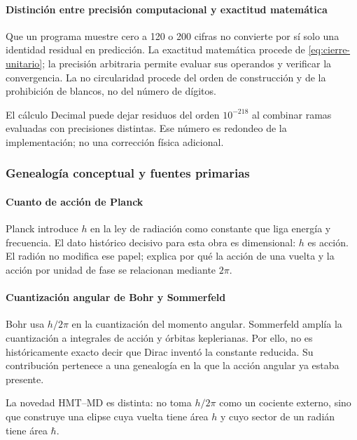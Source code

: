 \paragraph{Distinción entre precisión computacional y exactitud matemática}

Que un programa muestre cero a 120 o 200 cifras no convierte por sí solo una
identidad residual en predicción. La exactitud matemática procede de
\eqref{eq:cierre-unitario}; la precisión arbitraria permite evaluar sus
operandos y verificar la convergencia. La no circularidad procede del orden
de construcción y de la prohibición de blancos, no del número de dígitos.

El cálculo Decimal puede dejar residuos del orden \(10^{-218}\) al combinar
ramas evaluadas con precisiones distintas. Ese número es redondeo de la
implementación; no una corrección física adicional.
\subsubsection{Genealogía conceptual y fuentes primarias}

\paragraph{Cuanto de acción de Planck}

Planck introduce \(h\) en la ley de radiación como constante que liga energía
y frecuencia. El dato histórico decisivo para esta obra es dimensional:
\(h\) es acción. El radión no modifica ese papel; explica por qué la acción de
una vuelta y la acción por unidad de fase se relacionan mediante \(2\pi\).

\paragraph{Cuantización angular de Bohr y Sommerfeld}

Bohr usa \(h/2\pi\) en la cuantización del momento angular. Sommerfeld amplía
la cuantización a integrales de acción y órbitas keplerianas. Por ello, no es
históricamente exacto decir que Dirac inventó la constante reducida. Su
contribución pertenece a una genealogía en la que la acción angular ya estaba
presente.

La novedad HMT--MD es distinta: no toma \(h/2\pi\) como un cociente externo,
sino que construye una elipse cuya vuelta tiene área \(h\) y cuyo sector de un
radián tiene área \(\hbar\).

